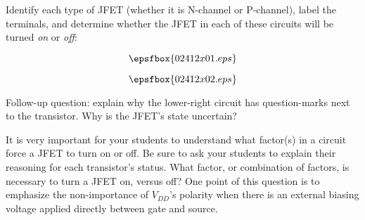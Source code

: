 

Identify each type of JFET (whether it is N-channel or P-channel), label the terminals, and determine whether the JFET in each of these circuits will be turned {\it on} or {\it off}:

$$\epsfbox{02412x01.eps}$$







$$\epsfbox{02412x02.eps}$$

\vskip 10pt

Follow-up question: explain why the lower-right circuit has question-marks next to the transistor.  Why is the JFET's state uncertain?







It is very important for your students to understand what factor(s) in a circuit force a JFET to turn on or off.  Be sure to ask your students to explain their reasoning for each transistor's status.  What factor, or combination of factors, is necessary to turn a JFET on, versus off?  One point of this question is to emphasize the non-importance of $V_{DD}$'s polarity when there is an external biasing voltage applied directly between gate and source.




